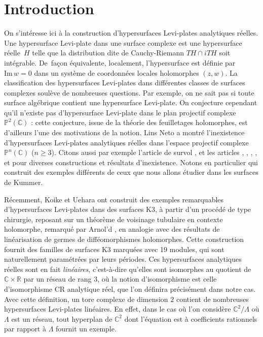 \documentclass[JEP,XML,SOM,Unicode,francais,published]{cedram}
\newcommand{\R}{\mathbb{R}}
\newcommand{\C}{\mathbb{C}}
\theoremstyle{definition}
\begin{document}
\section{Introduction}
On s'intéresse ici à la construction d'hypersurfaces Levi-plates analytiques réelles. Une hypersurface Levi-plate dans une surface complexe est une hypersurface réelle~$H$ telle que la distribution dite de Cauchy-Riemann $TH \cap iTH$ soit intégrable. \hbox{De~façon} équivalente, localement, l'hypersurface est définie par $\mathrm{Im}\,w = 0$ dans un système de coordonnées locales holomorphes $(z, w)$. La classification des hypersurfaces Levi-plates dans différentes classes de surfaces complexes soulève de nombreuses questions. Par exemple, on ne sait pas si toute surface algébrique contient une hypersurface Levi-plate. On conjecture cependant qu'il n'existe pas d'hypersurface Levi-plate dans le plan projectif complexe $\mathbb{P}^2(\C)$ \cite{cerveau-minimaux}: cette conjecture, issue de la théorie des feuilletages holomorphes, est d'ailleurs l'une des motivations de la notion. Lins Neto \cite{lins-neto} a montré l'inexistence d'hypersurfaces Levi-plates analytiques réelles dans l'espace projectif complexe $\mathbb{P}^n(\C)$ ($n \geq 3$). Citons aussi par exemple l'article de survol \cite{ohsawa-survey}, et les articles \cite{barrett1992topology}, \cite{inaba1994real}, \cite{nemirovskii1999stein}, \cite{deroin2016topology}, \cite{canales} et \cite{adachi2020levi} pour diverses constructions et résultats d'inexistence. Notons en particulier \cite{ohsawa2006levi} qui construit des exemples différents de ceux que nous allons étudier dans les surfaces de Kummer.

Récemment, Koike et Uehara \cite{koike2019gluing} ont construit des exemples remarquables d'hyper\-surfaces Levi-plates dans des surfaces K3, à partir d'un procédé de type chirurgie, reposant sur un théorème de voisinage tubulaire en contexte holomorphe, remarqué par Arnol'd \cite{arnol1976bifurcations}, en analogie avec des résultats de linéarisation de germes de difféomorphismes holomorphes. Cette construction fournit des familles de surfaces K3 marquées avec 19 modules, qui sont naturellement paramétrées par leurs périodes. Ces hypersurfaces analytiques réelles sont en fait \emph{linéaires}, c'est-à-dire qu'elles sont isomorphes au quotient de $\C \times \R$ par un réseau de rang $3$, où la notion d'isomorphisme est celle d'isomorphisme CR analytique réel, que l'on définira précisément dans notre cas. Avec cette définition, un tore complexe de dimension $2$ contient de nombreuses hypersurfaces Levi-plates linéaires. En effet, dans le cas où l'on considère $\C^2/\Lambda$ où $\Lambda$ est un réseau, tout hyperplan de $\C^2$ dont l'équation est à coefficients rationnels par rapport à $\Lambda$ fournit un exemple.
\end{document}
